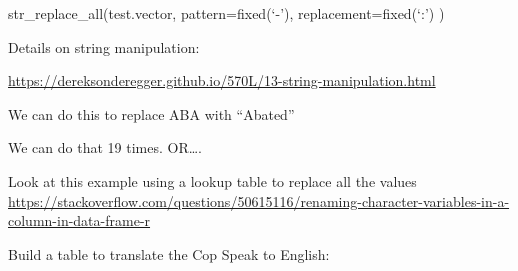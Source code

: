\documentclass[]{book}
\newenvironment{Shaded}{\begin{snugshade}}{\end{snugshade}}
\newcommand{\CommentTok}[1]{\textcolor[rgb]{0.56,0.35,0.01}{\textit{#1}}}
\newcommand{\DataTypeTok}[1]{\textcolor[rgb]{0.13,0.29,0.53}{#1}}
\newcommand{\KeywordTok}[1]{\textcolor[rgb]{0.13,0.29,0.53}{\textbf{#1}}}
\newcommand{\NormalTok}[1]{#1}
\newcommand{\OperatorTok}[1]{\textcolor[rgb]{0.81,0.36,0.00}{\textbf{#1}}}
\newcommand{\StringTok}[1]{\textcolor[rgb]{0.31,0.60,0.02}{#1}}
\begin{document}
str\_replace\_all(test.vector, pattern=fixed(`-'), replacement=fixed(`:') )

Details on string manipulation:

\url{https://dereksonderegger.github.io/570L/13-string-manipulation.html}

We can do this to replace ABA with ``Abated''

\begin{Shaded}
\end{Shaded}

We can do that 19 times. OR\ldots{}.

Look at this example using a lookup table to replace all the values\\
\url{https://stackoverflow.com/questions/50615116/renaming-character-variables-in-a-column-in-data-frame-r}

Build a table to translate the Cop Speak to English:
\end{document}
